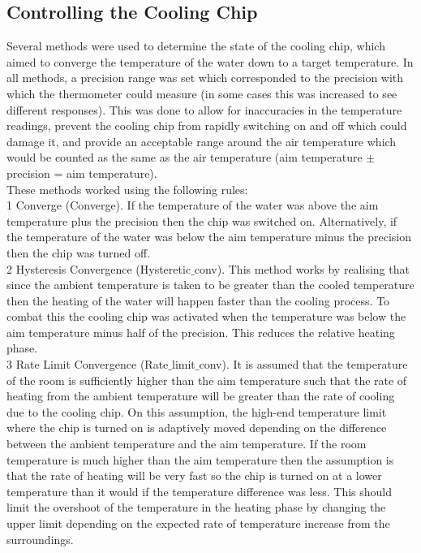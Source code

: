 \documentclass[10pt]{article}
\begin{document}

\subsection*{Controlling the Cooling Chip}
Several methods were used to determine the state of the cooling chip, which aimed to converge the temperature of the water down to a target temperature. In all methods, a precision range was set which corresponded to the precision with which the thermometer could measure (in some cases this was increased to see different responses). This was done to allow for inaccuracies in the temperature readings, prevent the cooling chip from rapidly switching on and off which could damage it, and provide an acceptable range around the air temperature which would be counted as the same as the air temperature (aim temperature $\pm$ precision = aim temperature).\\

These methods worked using the following rules:\\ %

1 Converge (Converge). If the temperature of the water was above the aim temperature plus the precision then the chip was switched on. Alternatively, if the temperature of the water was below the aim temperature minus the precision then the chip was turned off.\\

2 Hysteresis Convergence (Hysteretic$\_$conv). This method works by realising that since the ambient temperature is taken to be greater than the cooled temperature then the heating of the water will happen faster than the cooling process. To combat this the cooling chip was activated when the temperature was below the aim temperature minus half of the precision. This reduces the relative heating phase.\\

3 Rate Limit Convergence (Rate$\_$limit$\_$conv). It is assumed that the temperature of the room is sufficiently higher than the aim temperature such that the rate of heating from the ambient temperature will be greater than the rate of cooling due to the cooling chip. On this assumption, the high-end temperature limit where the chip is turned on is adaptively moved depending on the difference between the ambient temperature and the aim temperature. If the room temperature is much higher than the aim temperature then the assumption is that the rate of heating will be very fast so the chip is turned on at a lower temperature than it would if the temperature difference was less. This should limit the overshoot of the temperature in the heating phase by changing the upper limit depending on the expected rate of temperature increase from the surroundings. \\
\end{document}

